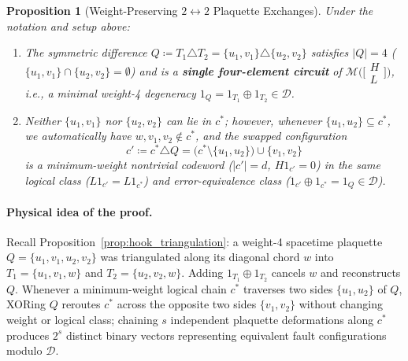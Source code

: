 \documentclass[12pt]{article}
\newtheorem{proposition}{Proposition}
\theoremstyle{definition}
\newcommand{\Dc}{\mathcal{D}}
\begin{document}
\begin{proposition}[Weight-Preserving $2 \leftrightarrow 2$ Plaquette Exchanges]\label{prop:plaquette_swap}
Under the notation and setup above:
\begin{enumerate}[label=(\alph*)]
  \item The symmetric difference $Q \coloneqq T_1 \triangle T_2 = \{u_1, v_1\} \triangle \{u_2, v_2\}$ satisfies
    $|Q| = 4$ ($\{u_1, v_1\} \cap \{u_2, v_2\} = \emptyset$) and is a \textbf{single four-element circuit} of
    $\mathcal{M}\bigl(\bigl[\begin{smallmatrix} H \\ L \end{smallmatrix}\bigr]\bigr)$, i.e., a minimal weight-4
    degeneracy $1_Q = 1_{T_1} \oplus 1_{T_2} \in \Dc$.
  \item Neither $\{u_1, v_1\}$ nor $\{u_2, v_2\}$ can lie in $c^*$; however, whenever $\{u_1, u_2\} \subseteq c^*$,
    we automatically have $w, v_1, v_2 \notin c^*$, and the swapped configuration
    \begin{equation}\label{eq:2to2_swap}
      c' \coloneqq c^* \triangle Q = \bigl(c^* \setminus \{u_1, u_2\}\bigr) \cup \{v_1, v_2\}
    \end{equation}
    is a minimum-weight nontrivial codeword ($|c'| = d$, $H 1_{c'} = 0$) in the same logical class ($L 1_{c'} = L
    1_{c^*}$) and error-equivalence class ($1_{c'} \oplus 1_{c^*} = 1_Q \in \Dc$).
\end{enumerate}
\end{proposition}

\paragraph{Physical idea of the proof.}
Recall Proposition~\ref{prop:hook_triangulation}: a weight-4 spacetime plaquette $Q = \{u_1, v_1, u_2, v_2\}$ was
triangulated along its diagonal chord $w$ into $T_1 = \{u_1, v_1, w\}$ and $T_2 = \{u_2, v_2, w\}$. Adding $1_{T_1}
\oplus 1_{T_2}$ cancels $w$ and reconstructs $Q$. Whenever a minimum-weight logical chain $c^*$ traverses two sides
$\{u_1, u_2\}$ of $Q$, XORing $Q$ reroutes $c^*$ across the opposite two sides $\{v_1, v_2\}$ without changing
weight or logical class; chaining $s$ independent plaquette deformations along $c^*$ produces $2^s$ distinct binary
vectors representing equivalent fault configurations modulo $\Dc$.
\end{document}
